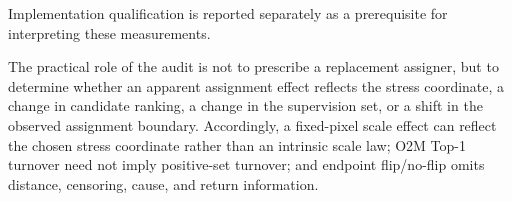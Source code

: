 Implementation qualification is reported separately as a prerequisite for interpreting these measurements.

The practical role of the audit is not to prescribe a replacement assigner, but to determine whether an apparent assignment effect reflects the stress coordinate, a change in candidate ranking, a change in the supervision set, or a shift in the observed assignment boundary. Accordingly, a fixed-pixel scale effect can reflect the chosen stress coordinate rather than an intrinsic scale law; O2M Top-1 turnover need not imply positive-set turnover; and endpoint flip/no-flip omits distance, censoring, cause, and return information.
